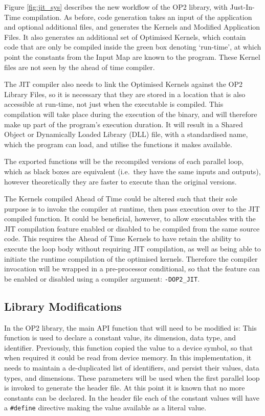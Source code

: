 \noindent Figure \ref{fig:jit_sys} describes the new workflow of the OP2 library, with Just-In-Time compilation. As before, code generation takes an input of the application and optional additional files, and generates the Kernels and Modified Application Files. It also generates an additional set of Optimised Kernels, which contain code that are only be compiled inside the green box denoting `run-time', at which point the constants from the Input Map are known to the program. These Kernel files are not seen by the ahead of time compiler.
\par
The JIT compiler also needs to link the Optimised Kernels against the OP2 Library Files, so it is necessary that they are stored in a location that is also accessible at run-time, not just when the executable is compiled. This compilation will take place during the execution of the binary, and will therefore make up part of the program's execution duration. It will result in a Shared Object or Dynamically Loaded Library (DLL) file, with a standardised name, which the program can load, and utilise the functions it makes available.
\par
The exported functions will be the recompiled versions of each parallel loop, which as black boxes are equivalent (i.e.\ they have the same inputs and outputs), however theoretically they are faster to execute than the original versions.
\par
The Kernels compiled Ahead of Time could be altered such that their sole purpose is to invoke the compiler at runtime, then pass execution over to the JIT compiled function. It could be beneficial, however, to allow executables with the JIT compilation feature enabled or disabled to be compiled from the same source code. This requires the Ahead of Time Kernels to have retain the ability to execute the loop body without requiring JIT compilation, as well as being able to initiate the runtime compilation of the optimised kernels. Therefore the compiler invocation will be wrapped in a pre-processor conditional, so that the feature can be enabled or disabled using a compiler argument: \verb|-DOP2_JIT|.

\subsection{Library Modifications}
In the OP2 library, the main API function that will need to be modified is:
\noindent This function is used to declare a constant value, its dimension, data type, and identifier.
Previously, this function copied the value to a device symbol, so that when required it could be read from device memory. In this implementation, it needs to maintain a de-duplicated list of identifiers, and persist their values, data types, and dimensions. These parameters will be used when the first parallel loop is invoked to generate the header file. At this point it is known that no more constants can be declared. In the header file each of the constant values will have a \verb|#define| directive making the value available as a literal value.

